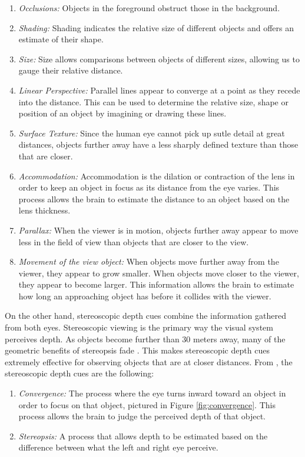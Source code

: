 \begin{enumerate}
	\item \textit{Occlusions:} Objects in the foreground obstruct those in the background.
	\item \textit{Shading:} Shading indicates the relative size of different objects and offers an estimate of their shape.
	\item \textit{Size:} Size allows comparisons between objects of different sizes, allowing us to gauge their relative distance.
	\item \textit{Linear Perspective:} Parallel lines appear to converge at a point as they recede into the distance. This can be used to determine the relative size, shape or position of an object by imagining or drawing these lines.
	\item \textit{Surface Texture:} Since the human eye cannot pick up sutle detail at great distances, objects further away have a less sharply defined texture than those that are closer.
	\item \textit{Accommodation:}  Accommodation is the dilation or contraction of the lens  in order to keep an object in focus as its distance from the eye varies. This process allows the brain to estimate the distance to an object based on the lens thickness.
	\item \textit{Parallax:} When the viewer is in motion, objects further away appear to move less in the field of view than objects that are closer to the view. 
	\item \textit{Movement of the view object:} When objects move further away from the viewer, they appear to grow smaller. When objects move closer to the viewer, they appear to become larger. This information allows the brain to estimate how long an approaching object has before it collides with the viewer.
\end{enumerate}





\par On the other hand, stereoscopic depth cues combine the information gathered from both eyes. Stereoscopic viewing is the primary way the visual system perceives depth. As objects become further than 30 meters away, many of the geometric benefits of stereopsis fade \cite{gobbetti}. This makes stereoscopic depth cues extremely effective for observing objects that are at closer distances. From \cite{mihelj_apps}, the stereoscopic depth cues are the following:


\begin{enumerate}
	\item \textit{Convergence:} The process where the eye turns inward toward an object in order to focus on that object, pictured in Figure \ref{fig:convergence}. This process allows the brain to judge the perceived depth of that object. 


	\item \textit{Stereopsis:} A process that allows depth to be estimated based on the difference between what the left and right eye perceive. 
\end{enumerate}


